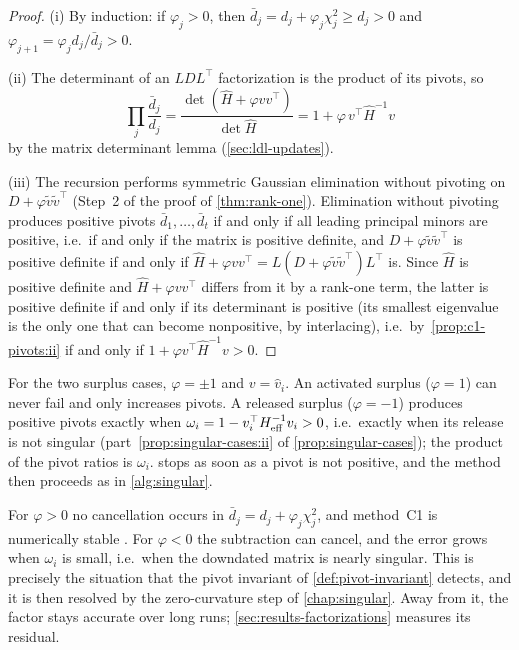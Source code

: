 \begin{proof}
(i) By induction: if $\varphi_j>0$, then $\bar d_j = d_j + \varphi_j\chi_j^2\ge d_j>0$ and
$\varphi_{j+1} = \varphi_jd_j/\bar d_j>0$.

(ii) The determinant of an $LDL^\top$ factorization is the product of its pivots, so
\[
\prod_j\frac{\bar d_j}{d_j} = \frac{\det(\hat H + \varphi vv^\top)}{\det\hat H}
= 1 + \varphi\,v^\top\hat H^{-1}v
\]
by the matrix determinant lemma (\cref{sec:ldl-updates}).

(iii) The recursion performs symmetric Gaussian elimination without pivoting on
$D + \varphi\tilde v\tilde v^\top$ (Step~2 of the proof of \cref{thm:rank-one}). Elimination without
pivoting produces positive pivots $\bar d_1,\dots,\bar d_t$ if and only if all leading principal
minors are positive, i.e.\ if and only if the matrix is positive definite, and
$D + \varphi\tilde v\tilde v^\top$ is positive definite if and only if
$\hat H + \varphi vv^\top = L(D+\varphi\tilde v\tilde v^\top)L^\top$ is. Since $\hat H$ is positive definite and
$\hat H + \varphi vv^\top$ differs from it by a rank-one term, the latter is positive definite if and
only if its determinant is positive (its smallest eigenvalue is the only one that can become
nonpositive, by interlacing), i.e.\ by~\ref{prop:c1-pivots:ii} if and only if $1 + \varphi v^\top\hat H^{-1}v>0$.
\end{proof}

For the two surplus cases, $\varphi = \pm1$ and $v = \hat v_i$. An activated surplus ($\varphi = 1$)
can never fail and only increases pivots. A released surplus ($\varphi = -1$) produces positive
pivots exactly when $\omega_i = 1 - v_i^\top H_{\mathrm{eff}}^{-1}v_i>0$, i.e.\ exactly when its release is not
singular (part~\ref{prop:singular-cases:ii} of \cref{prop:singular-cases}); the product of the pivot ratios is $\omega_i$.
 stops as soon as a pivot is not positive, and the method then proceeds as in
\cref{alg:singular}.

\begin{remark} \label{rem:c1-stability}
For $\varphi>0$ no cancellation occurs in $\bar d_j = d_j + \varphi_j\chi_j^2$, and method~C1 is
numerically stable \cite{gill1974methods}. For $\varphi<0$ the subtraction can cancel, and the
error grows when $\omega_i$ is small, i.e.\ when the downdated matrix is nearly singular. This is
precisely the situation that the pivot invariant of \cref{def:pivot-invariant} detects, and it
is then resolved by the zero-curvature step of \cref{chap:singular}. Away from it, the factor
stays accurate over long runs; \cref{sec:results-factorizations} measures its residual.
\end{remark}


